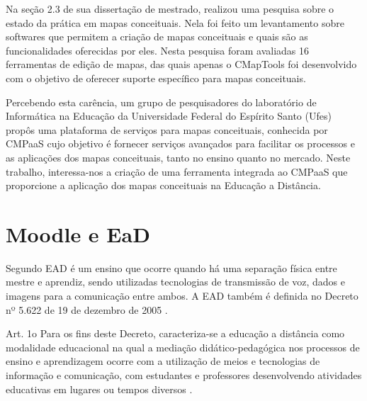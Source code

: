 \documentclass[
	12pt,				%
	openright,			%
	oneside,			%
	a4paper,			%
	english,			%
	french,				%
	spanish,			%
	brazil				%
	]{abntex2}
\begin{document}
Na seção 2.3 de sua dissertação de mestrado,  realizou uma pesquisa sobre o estado da prática em mapas conceituais. Nela foi feito um levantamento sobre softwares que permitem a criação de mapas conceituais e quais são as funcionalidades oferecidas por eles. Nesta pesquisa foram avaliadas 16 ferramentas de edição de mapas, das quais apenas o CMapTools foi desenvolvido com o objetivo de oferecer suporte específico para mapas conceituais.

Percebendo esta carência, um grupo de pesquisadores do laboratório de Informática na Educação da Universidade Federal do Espírito Santo (Ufes) propôs uma plataforma de serviços para mapas conceituais, conhecida por CMPaaS \cite{Perin2016} cujo objetivo é fornecer serviços avançados para facilitar os processos e as aplicações dos mapas conceituais, tanto no ensino quanto no mercado. Neste trabalho, interessa-nos a criação de uma ferramenta integrada ao CMPaaS que proporcione a aplicação dos mapas conceituais na Educação a Distância. 
  




\section{Moodle e EaD}\label{cap-ead}

Segundo  EAD é um ensino que ocorre quando há uma separação física entre mestre e aprendiz, sendo utilizadas tecnologias de transmissão de voz, dados e imagens para a comunicação entre ambos. A EAD também é definida no Decreto nº 5.622 de 19 de dezembro de 2005 \cite{BRASIL2005}.
 \begin{citacao}
 	Art. 1o  Para os fins deste Decreto, caracteriza-se a educação a distância como modalidade educacional na qual a mediação didático-pedagógica nos processos de ensino e aprendizagem ocorre com a utilização de meios e tecnologias de informação e comunicação, com estudantes e professores desenvolvendo atividades educativas em lugares ou tempos diversos \cite{BRASIL2005}.
 \end{citacao}
 
\end{document}
